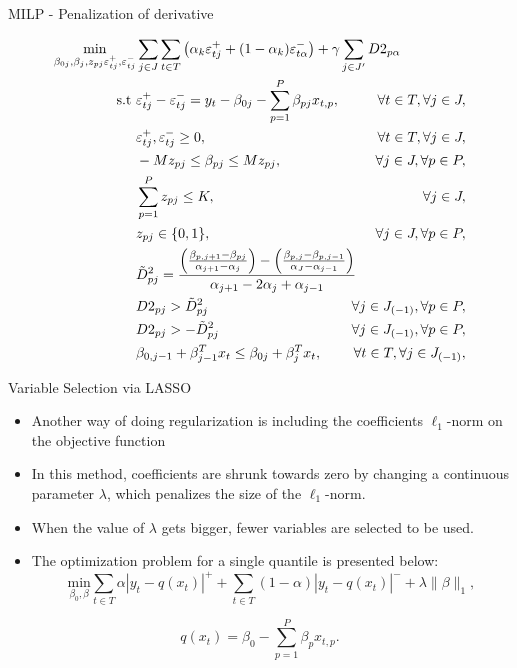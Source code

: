 \begin{frame}{MILP - Penalization of derivative}

\tiny

\begin{eqnarray}
 \underset{\beta_{0j},\beta_j,z_{p j} \varepsilon_{t j}^{+},\varepsilon_{t j}^{-}}{\text{min}} & \sum_{j \in J} \sum_{t\in T}\left(\alpha_k \varepsilon_{t j}^{+}+(1-\alpha_k)\varepsilon_{t\alpha}^{-}\right) + \gamma \sum_{j \in J'} D2_{p\alpha} \span \\
\mbox{s.t } & \varepsilon_{t j}^{+}-\varepsilon_{t j}^{-}=y_{t}-\beta_{0 j}-\sum_{p=1}^{P}\beta_{p j}x_{t,p},& \forall t \in T ,\forall j \in J, \\
& \varepsilon_{t j}^{+},\varepsilon_{t j}^{-}\geq0,&\forall t \in T ,\forall j \in J, \label{eq:mip2}\\
& - M z_{p j} \leq \beta_{p j} \leq M z_{p j},& \forall j \in J, \forall p\in P, \label{eq:mip3}\\
& \sum_{p=1}^P z_{p j} \leq K, & \qquad \forall j \in J, \label{eq:mip4}\\
& z_{p j} \in \{0,1\},& \forall j \in J, \forall p\in P, \label{eq:mip5}\\
& \tilde{D}_{pj}^{2}=\frac{\left(\frac{\beta_{p,j+1}-\beta_{pj}}{\alpha_{j+1}-\alpha_{j}}\right)-\left(\frac{\beta_{p,j}-\beta_{p,j-1}}{\alpha_{J}-\alpha_{j-1}}\right)}{\alpha_{j+1}-2\alpha_{j}+\alpha_{j-1}} \span\\
& D2_{pj} >  \tilde D_{pj}^{2} &  \forall j \in J_{(-1)}, \forall p\in P, \\
& D2_{pj} >  - \tilde D_{pj}^{2} &  \forall j \in J_{(-1)}, \forall p\in P,\\
& \beta_{0,j-1} + \beta_{j-1}^T x_{t} \leq \beta_{0j} + \beta_{j}^T x_{t}, & \forall t \in T, \forall j \in J_{(-1)},
\end{eqnarray}

\end{frame}

\begin{frame}{Variable Selection via LASSO}

\begin{itemize}
\tightlist
\item
  Another way of doing regularization is including the coefficients
  \(\ell_1\)-norm on the objective function
\item
  In this method, coefficients are shrunk towards zero by changing a
  continuous parameter \(\lambda\), which penalizes the size of the
  \(\ell_1\)-norm.\\
\item
  When the value of \(\lambda\) gets bigger, fewer variables are
  selected to be used.
\item
  The optimization problem for a single quantile is presented below: \[
  \underset{\beta_{0},\beta}{\text{min}} \sum_{t \in T}\alpha|y_{t}-q(x_t)|^{+}+ \sum_{t \in T}(1-\alpha)|y_{t}-q(x_t)|^{-}+\lambda\|\beta\|_{1},
  \]
\end{itemize}

\[
q(x_t)=\beta_{0}-\sum_{p=1}^{P}\beta_{p}x_{t,p}.
\]

\end{frame}

